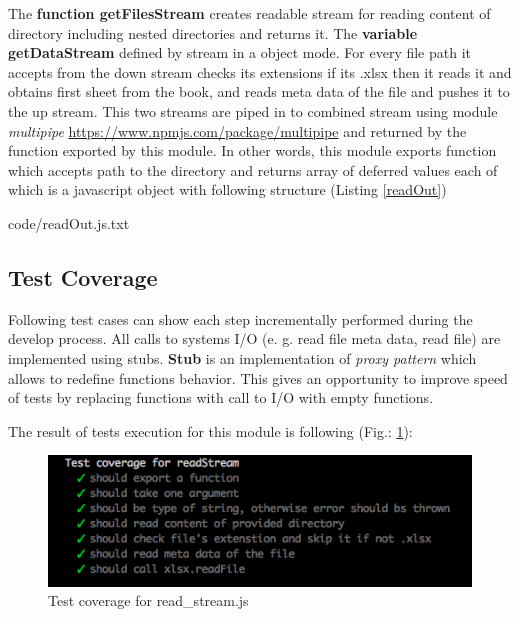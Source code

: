%
The \textbf{function getFilesStream} creates readable stream for reading content of directory including nested directories and returns it. 
The \textbf{variable getDataStream} defined by stream in a object mode. For every file path it accepts from the down stream  checks its extensions if its .xlsx then it reads it and obtains first sheet from the book, and reads meta data of the file and pushes it to the up stream.
This two streams are piped in to combined stream using module \textit{multipipe} \url{https://www.npmjs.com/package/multipipe} and returned by the function exported by this module.
In other words, this module exports function which accepts path to the directory and returns array of deferred values each of which is a javascript object with following structure (Listing \ref{readOut})

{code/readOut.js.txt}

\subsection{Test Coverage}
Following test cases can show each step incrementally performed during the develop process. All calls to systems I/O (e. g. read file meta data, read file) are implemented using stubs. \textbf{Stub} is an implementation of \textit{proxy pattern} which allows to redefine functions behavior. This gives an opportunity to improve speed of tests by replacing functions with call to I/O with empty functions.
%

The result of tests execution  for this module is following (Fig.: \ref{fig:testRead}):
\begin{figure}[H]
	\centering
	\includegraphics[width=\linewidth]{grafiken/testReadStream.png}
	\caption{Test coverage for read\_stream.js}
	\label{fig:testRead}
\end{figure}



